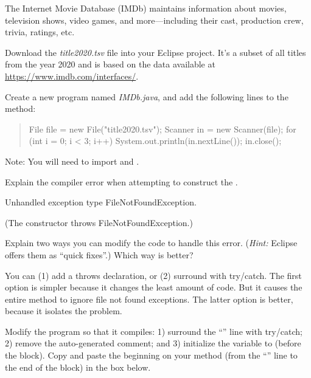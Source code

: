 
The Internet Movie Database (IMDb) maintains information about movies, television shows, video games, and more---including their cast, production crew, trivia, ratings, etc.

\vspace{1em}

Download the \textit{title2020.tsv} file into your Eclipse project.
It's a subset of all titles from the year 2020 and is based on the data available at \url{https://www.imdb.com/interfaces/}.

\vspace{1em}

Create a new program named \textit{IMDb.java}, and add the following lines to the  method:

\begin{quote}
\begin{javalst}
File file = new File("title2020.tsv");
Scanner in = new Scanner(file);
for (int i = 0; i < 3; i++) {
    System.out.println(in.nextLine());
}
in.close();
\end{javalst}
\end{quote}

Note: You will need to import  and .



\Q Explain the compiler error when attempting to construct the .

\begin{answer}[3em]
Unhandled exception type FileNotFoundException.

(The constructor throws FileNotFoundException.)
\end{answer}


\Q Explain two ways you can modify the code to handle this error.
(\textit{Hint:} Eclipse offers them as ``quick fixes''.)
Which way is better?

\begin{answer}[5em]
You can (1) add a throws declaration, or (2) surround with try/catch.
The first option is simpler because it changes the least amount of code.
But it causes the entire method to ignore file not found exceptions.
The latter option is better, because it isolates the problem.
\end{answer}


\Q \label{FNF}
Modify the program so that it compiles:
1) surround the ``'' line with try/catch;
2) remove the auto-generated  comment; and
3) initialize the  variable to  (before the  block).
Copy and paste the beginning on your  method (from the ``'' line to the end of the  block) in the box below.

